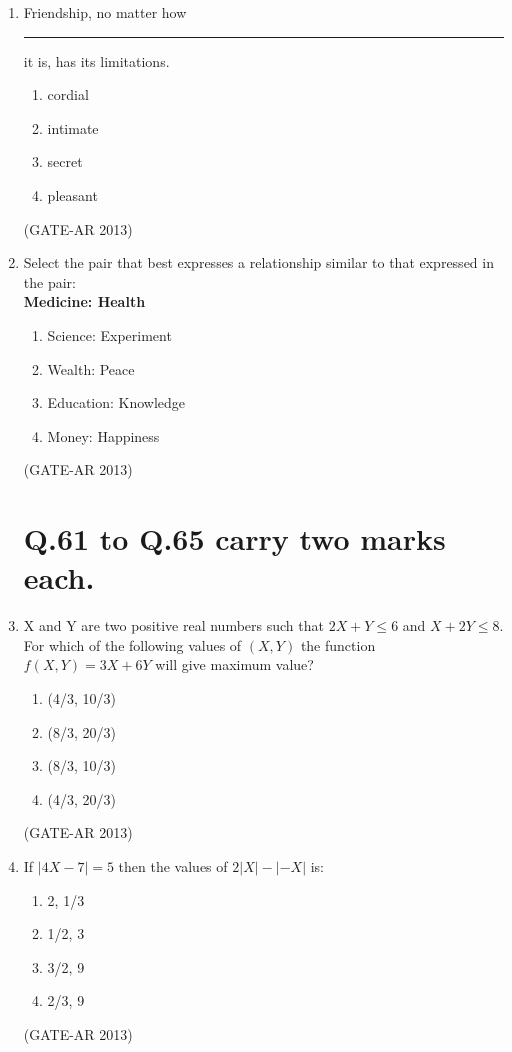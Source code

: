 \documentclass[a4paper,10pt]{article}
\begin{document}
\begin{enumerate}
    \item Friendship, no matter how \rule{2cm}{0.4pt} it is, has its limitations.
    \begin{enumerate}
        \item cordial
        \item intimate
        \item secret
        \item pleasant
    \end{enumerate}
    \hfill (GATE-AR 2013)

    \item Select the pair that best expresses a relationship similar to that expressed in the pair: \\
    \textbf{Medicine: Health}
    \begin{multicols}{2}
	\begin{enumerate}
        \item Science: Experiment
        \item Wealth: Peace
        \item Education: Knowledge
        \item Money: Happiness
    \end{enumerate}
	\end{multicols}
    \hfill (GATE-AR 2013)

\section*{Q.61 to Q.65 carry two marks each.}

    \item X and Y are two positive real numbers such that $2X + Y \leq 6$ and $X + 2Y \leq 8$. For which of the following values of $(X,Y)$ the function $f(X,Y) = 3X + 6Y$ will give maximum value?
    \begin{enumerate}
        \item (4/3, 10/3)
        \item (8/3, 20/3)
        \item (8/3, 10/3)
        \item (4/3, 20/3)
    \end{enumerate}
    \hfill (GATE-AR 2013)

    \item If $|4X - 7| = 5$ then the values of $2|X| - |-X|$ is:
    \begin{multicols}{4}
	\begin{enumerate}
        \item 2, 1/3
        \item 1/2, 3
        \item 3/2, 9
        \item 2/3, 9
    \end{enumerate}
	\end{multicols}
    \hfill (GATE-AR 2013)


\end{enumerate}
\end{document}
